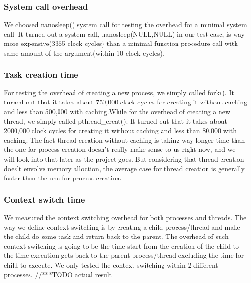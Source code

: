 \subsubsection{System call overhead}
We choosed nanosleep() system call for testing the overhead for a minimal system call. It turned out a system call, nanosleep(NULL,NULL) in our test case, is way more expensive(3365 clock cycles) than a minimal function procedure call with same amount of the argument(within 10 clock cycles).

\subsubsection{Task creation time}
For testing the overhead of creating a new process, we simply called fork(). It turned out that it takes about 750,000 clock cycles for creating it without caching and less than 500,000 with caching.While for the overhead of creating a new thread, we simply called pthread\_creat(). It turned out that it takes about 2000,000 clock cycles for creating it without caching and less than 80,000 with caching.
The fact thread creation without caching is taking way longer time than the one for process creation doesn't really make sense to us right now, and we will look into that later as the project goes. But considering that thread creation does't envolve memory alloction, the average case for thread creation is generally faster then the one for process creation.


\subsubsection{Context switch time}
We measured the context switching overhead for both processes and threads. The way we define context switching is by creating a child process/thread and make the child do some task and return back to the parent. The overhead of such context switching is going to be the time start from the creation of the child to the time execution gets back to the parent process/thread excluding the time for child to execute. We only tested the context switching within 2 different processes.
//***TODO actual result



